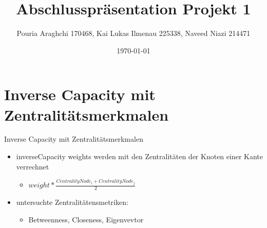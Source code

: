 \documentclass[aspectratio=169,10pt]{beamer}
\title{Abschlusspr\"asentation Projekt 1}
\author{Pouria Araghchi 170468, Kai Lukas Ilmenau 225338, Naveed Niazi 214471}
\institute{TU Dortmund - Fachprojekt zu "Routingalgorithmen"}
\date{\today}
\begin{document}
\maketitle
\section{Inverse Capacity mit Zentralit\"atsmerkmalen}

\begin{frame}{Inverse Capacity mit Zentralit\"atsmerkmalen}
    \begin{itemize}
        \item inverseCapacity weights werden mit den Zentralit\"aten der Knoten einer Kante verrechnet
        \begin{itemize}
            \item $weight * \frac{CentralityNode_i + CentralityNode_j}{2}$
        \end{itemize}
        \item untersuchte Zentralit\"atensmetriken:
        \begin{itemize}
            \item Betweenness, Closeness, Eigenvevtor
        \end{itemize}
    \end{itemize}
\end{frame}
\end{document}
